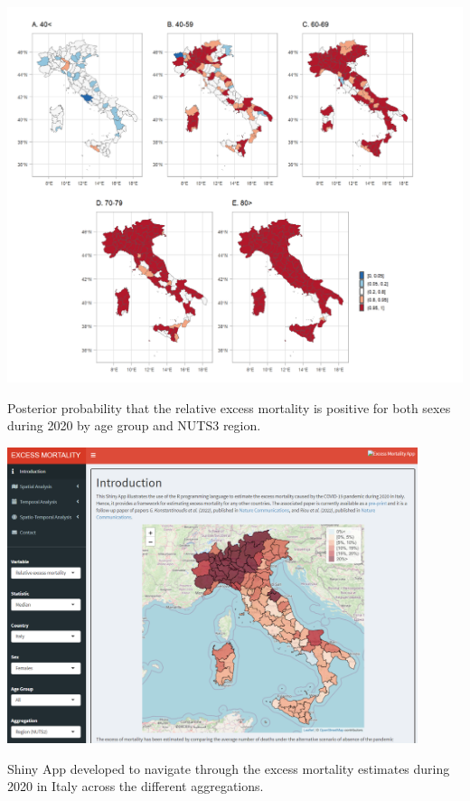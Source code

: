 \begin{widefigure}[H]
	\begin{flushright}
		\includegraphics{PosteriorProb.png}
	\end{flushright}
	\caption{Posterior probability that the relative excess mortality is positive for both sexes during 2020 by age group and NUTS3 region. }
	\label{PosteriorProb}
\end{widefigure}
		
\begin{widefigure}[!t]
	\begin{center}
		\includegraphics[width=0.9\textwidth]{ShinyApp.png}
	\end{center}
	\caption{Shiny App developed to navigate through the excess mortality estimates during 2020 in Italy across the different aggregations.}
	\label{shinyapp}
\end{widefigure}

